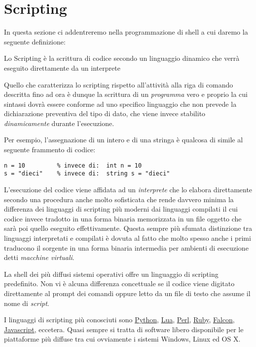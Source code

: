 
\chapter{Scripting}
\label{chapScripting}

In questa sezione ci addentreremo nella programmazione di shell a cui daremo
la seguente definizione:

\begin{tcolorbox}[title=Definizione di \emph{Scripting}]
Lo Scripting è la scrittura di codice secondo un linguaggio dinamico che verrà
eseguito direttamente da un interprete
\end{tcolorbox}

Quello che caratterizza lo scripting rispetto all'attività alla riga di
comando descritta fino ad ora è dunque la scrittura di un \emph{programma}
vero e proprio la cui sintassi dovrà essere conforme ad uno specifico
linguaggio che non prevede la dichiarazione preventiva del tipo di dato, che
viene invece stabilito \emph{dinamicamente} durante l'esecuzione.

Per esempio, l'assegnazione di un intero e di una stringa è qualcosa di simile
al seguente frammento di codice:
\begin{Verbatim}
n = 10         % invece di:  int n = 10
s = "dieci"    % invece di:  string s = "dieci"
\end{Verbatim}

L'esecuzione del codice viene affidata ad un \emph{interprete} che lo
elabora direttamente secondo una procedura anche molto sofisticata che rende
davvero minima la differenza dei linguaggi di scripting più moderni dai
linguaggi compilati il cui codice invece tradotto in una forma binaria
memorizzata in un file oggetto che sarà poi quello eseguito effettivamente.
Questa sempre più sfumata distinzione tra linguaggi interpretati e compilati è
dovuta al fatto che molto spesso anche i primi traducono il sorgente in
una forma binaria intermedia per ambienti di esecuzione detti \emph{macchine
virtuali}.

La shell dei più diffusi sistemi operativi offre un linguaggio di
scripting predefinito. Non vi è alcuna differenza concettuale se il codice
viene digitato direttamente al prompt dei comandi oppure letto da un file di
testo che assume il nome di \emph{script}.

I linguaggi di scripting più conosciuti sono
\href{http://www.python.org/}{Python}, \href{http://www.lua.org/}{Lua},
\href{http://www.perl.org/}{Perl}, \href{http://www.ruby-lang.org/}{Ruby},
\href{http://www.falconpl.org/}{Falcon},
\href{http://it.wikipedia.org/wiki/JavaScript}{Javascript}, eccetera. Quasi
sempre si tratta di software libero disponibile per le piattaforme più diffuse
tra cui ovviamente i sistemi Windows, Linux ed OS X.

